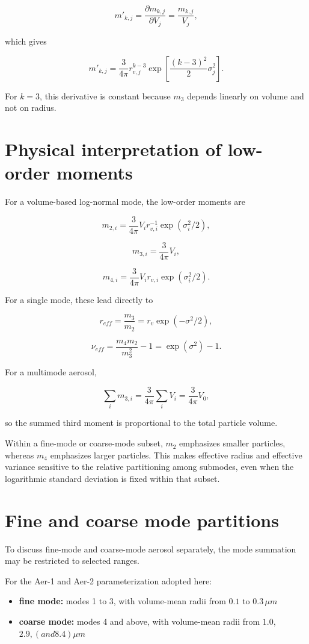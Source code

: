 \documentclass[
  11pt,
  letterpaper,
  DIV=11,
  numbers=noendperiod]{scrreprt}
\providecommand{\tightlist}{%
  \setlength{\itemsep}{0pt}\setlength{\parskip}{0pt}}
\begin{document}
\[
m'_{k,j}=\frac{\partial m_{k,j}}{\partial V_j}=\frac{m_{k,j}}{V_j},
\]

which gives

\[
m'_{k,j}=\frac{3}{4 \pi}
r^{k-3}_{v,j} \exp\left[\frac{(k-3)^2}{2} \sigma_j^2\right].
\]

For \(k=3\), this derivative is constant because \(m_3\) depends
linearly on volume and not on radius.

\section{Physical interpretation of low-order
moments}\label{physical-interpretation-of-low-order-moments}

For a volume-based log-normal mode, the low-order moments are

\[
m_{2,i}=\frac{3}{4\pi} V_i r_{v,i}^{-1} \exp(\sigma_i^2/2),
\]

\[
m_{3,i}=\frac{3}{4\pi} V_i,
\]

\[
m_{4,i}=\frac{3}{4\pi} V_i r_{v,i} \exp(\sigma_i^2/2).
\]

For a single mode, these lead directly to

\[
r_{eff}=\frac{m_3}{m_2}=r_v \exp(-\sigma^2/2),
\]

\[
\nu_{eff}=\frac{m_4 m_2}{m_3^2}-1=\exp (\sigma^2)-1.
\]

For a multimode aerosol,

\[
\sum_i m_{3,i}=\frac{3}{4\pi}\sum_i V_i=\frac{3}{4\pi} V_0,
\]

so the summed third moment is proportional to the total particle volume.

Within a fine-mode or coarse-mode subset, \(m_2\) emphasizes smaller
particles, whereas \(m_4\) emphasizes larger particles. This makes
effective radius and effective variance sensitive to the relative
partitioning among submodes, even when the logarithmic standard
deviation is fixed within that subset.

\section{Fine and coarse mode
partitions}\label{fine-and-coarse-mode-partitions}

To discuss fine-mode and coarse-mode aerosol separately, the mode
summation may be restricted to selected ranges.

For the Aer-1 and Aer-2 parameterization adopted here:

\begin{itemize}
\tightlist
\item
  \textbf{fine mode:} modes 1 to 3, with volume-mean radii from \(0.1\)
  to \(0.3 \, \mu m\)
\item
  \textbf{coarse mode:} modes 4 and above, with volume-mean radii from
  \(1.0\), \(2.9, (and 8.4) \mu m\)
\end{itemize}
\end{document}
